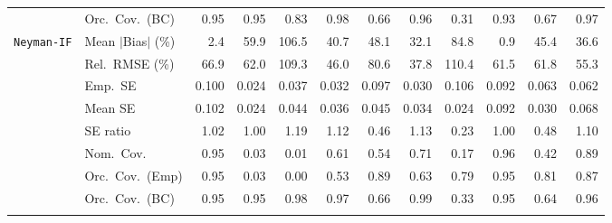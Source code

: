 \begin{landscape}
\begin{longtable}{llrrrrrrrrrr}
 & Orc.\ Cov.\ (BC) & \cellcolor{rankone}0.95 & \cellcolor{rankone}0.95 & 0.83 & 0.98 & 0.66 & \cellcolor{ranktwo}0.96 & 0.31 & \cellcolor{rankthree}0.93 & 0.67 & \cellcolor{rankthree}0.97 \\
\addlinespace[2pt]
\quad \texttt{Neyman-IF} & Mean $|$Bias$|$ (\%) & \cellcolor{ranktwo}2.4 & 59.9 & 106.5 & 40.7 & 48.1 & \cellcolor{rankthree}32.1 & 84.8 & \cellcolor{rankone}0.9 & 45.4 & 36.6 \\
 & Rel.\ RMSE (\%) & 66.9 & 62.0 & 109.3 & \cellcolor{ranktwo}46.0 & 80.6 & \cellcolor{rankone}37.8 & 110.4 & 61.5 & 61.8 & \cellcolor{rankthree}55.3 \\
 & Emp.\ SE & 0.100 & 0.024 & 0.037 & 0.032 & 0.097 & 0.030 & 0.106 & 0.092 & 0.063 & 0.062 \\
 & Mean SE & 0.102 & 0.024 & 0.044 & 0.036 & 0.045 & 0.034 & 0.024 & 0.092 & 0.030 & 0.068 \\
 & SE ratio & \cellcolor{ranktwo}1.02 & \cellcolor{rankone}1.00 & 1.19 & 1.12 & 0.46 & 1.13 & 0.23 & \cellcolor{rankone}1.00 & 0.48 & \cellcolor{rankthree}1.10 \\
 & Nom.\ Cov. & \cellcolor{rankone}0.95 & 0.03 & 0.01 & 0.61 & 0.54 & 0.71 & 0.17 & \cellcolor{ranktwo}0.96 & 0.42 & \cellcolor{rankthree}0.89 \\
 & Orc.\ Cov.\ (Emp) & \cellcolor{rankone}0.95 & 0.03 & 0.00 & 0.53 & \cellcolor{ranktwo}0.89 & 0.63 & 0.79 & \cellcolor{rankone}0.95 & 0.81 & \cellcolor{rankthree}0.87 \\
 & Orc.\ Cov.\ (BC) & \cellcolor{rankone}0.95 & \cellcolor{rankone}0.95 & 0.98 & \cellcolor{rankthree}0.97 & 0.66 & 0.99 & 0.33 & \cellcolor{rankone}0.95 & 0.64 & \cellcolor{ranktwo}0.96 \\
\addlinespace[2pt]
\end{longtable}
\end{landscape}


